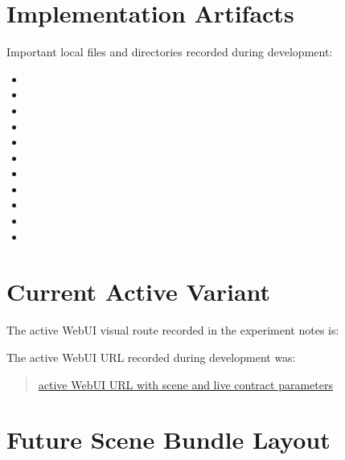 \documentclass[11pt]{article}
\begin{document}
\section{Implementation Artifacts}

Important local files and directories recorded during development:

\begin{itemize}
    \item {}
    \item {}
    \item {}
    \item {}
    \item {}
    \item {}
    \item {}
    \item {}
    \item {}
    \item {}
    \item {}
\end{itemize}

\section{Current Active Variant}

The active WebUI visual route recorded in the experiment notes is:

\begin{quote}
\end{quote}

The active WebUI URL recorded during development was:

\begin{quote}
\href{http://10.224.36.118:5173/?scene=/scenes/lingbot-live/manifest.json&mode=live&liveContract=/contracts/lingbot-map-video-playback.live-contract.json}{active WebUI URL with scene and live contract parameters}
\end{quote}

\section{Future Scene Bundle Layout}
\end{document}
